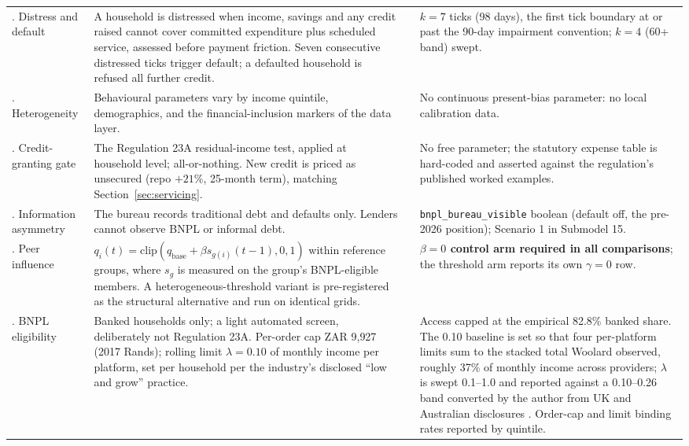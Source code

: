 \begin{longtable}{L{2.35cm}L{4.75cm}L{2.3cm}L{4.0cm}}
. Distress and default & A household is distressed when income, savings and any credit raised cannot cover committed expenditure plus scheduled service, assessed before payment friction. Seven consecutive distressed ticks trigger default; a defaulted household is refused all further credit. & \cite{madeira2018chile} & $k=7$ ticks (98 days), the first tick boundary at or past the 90-day impairment convention; $k=4$ (60+ band) swept. \\
. Heterogeneity & Behavioural parameters vary by income quintile, demographics, and the financial-inclusion markers of the data layer. & \cite{Keys2019} & No continuous present-bias parameter: no local calibration data. \\
. Credit-granting gate & The Regulation 23A residual-income test, applied at household level; all-or-nothing. New credit is priced as unsecured (repo $+21\%$, 25-month term), matching Section~\ref{sec:servicing}. & \cite{sa_ncr_affordability_2015} & No free parameter; the statutory expense table is hard-coded and asserted against the regulation's published worked examples. \\
. Information asymmetry & The bureau records traditional debt and defaults only. Lenders cannot observe \ac{BNPL} or informal debt. & \cite{nortonrose_bnpl_sa, transunion_cps_sa_2025} & \texttt{bnpl\_bureau\_visible} boolean (default off, the pre-2026 position); Scenario 1 in Submodel 15. \\
. Peer influence & $q_i(t) = \mathrm{clip}(q_{\text{base}} + \beta s_{g(i)}(t-1), 0, 1)$ within reference groups, where $s_g$ is measured on the group's \ac{BNPL}-eligible members. A heterogeneous-threshold variant is pre-registered as the structural alternative and run on identical grids. & \cite{ackert2025bnpl, cardaci2018inequality, granovetter1978threshold} & \textbf{$\beta=0$ control arm required in all comparisons}; the threshold arm reports its own $\gamma=0$ row. \\
. \ac{BNPL} eligibility & Banked households only; a light automated screen, deliberately not Regulation 23A. Per-order cap ZAR 9{,}927 (2017 Rands); rolling limit $\lambda = 0.10$ of monthly income per platform, set per household per the industry's disclosed ``low and grow'' practice. & \cite{payflex_terms, payjustnow_terms, homechoice2024ir} & Access capped at the empirical 82.8\% banked share. The 0.10 baseline is set so that four per-platform limits sum to the stacked total Woolard observed, roughly 37\% of monthly income across providers; $\lambda$ is swept 0.1--1.0 and reported against a 0.10--0.26 band converted by the author from UK and Australian disclosures \cite{woolard2021, asic2020rep672}. Order-cap and limit binding rates reported by quintile. \\

\end{longtable}
